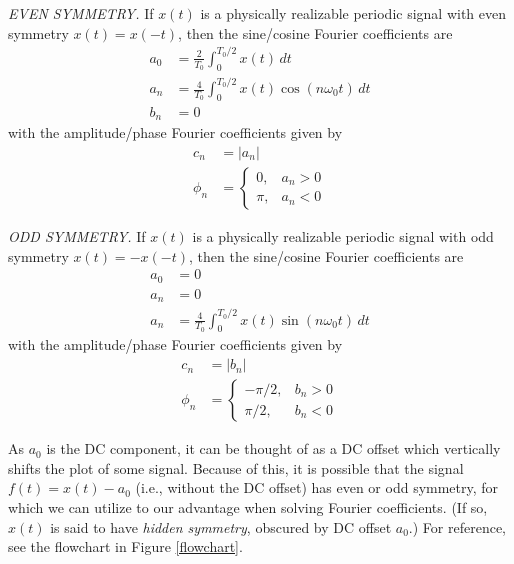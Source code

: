 \documentclass{report}
\begin{document}
\begin{tcolorbox}[width=\textwidth,colback={white}, sharp corners]
    \emph{EVEN SYMMETRY.}
    If $x(t)$ is a physically realizable periodic signal with even symmetry $x(t) = x(-t)$, then the sine/cosine Fourier coefficients are 
    \begin{align}
        a_0 &= \frac{2}{T_0}\int_{0}^{T_0/2} x(t) \,dt \\
        a_n &= \frac{4}{T_0}\int_{0}^{T_0/2} x(t)\cos(n\omega_0 t) \,dt \\
        b_n &= 0
    \end{align}
    with the amplitude/phase Fourier coefficients given by    
    \begin{align}
        c_n &= |a_n| \\
        \phi_n &= 
        \begin{cases}
            0, & a_n > 0 \\
            \pi, & a_n < 0
        \end{cases}
    \end{align}
\end{tcolorbox}
\begin{tcolorbox}[width=\textwidth,colback={white}, sharp corners]
    \emph{ODD SYMMETRY.}
    If $x(t)$ is a physically realizable periodic signal with odd symmetry $x(t) = -x(-t)$, then the sine/cosine Fourier coefficients are 
    \begin{align}
        a_0 &= 0 \\
        a_n &= 0 \\
        a_n &= \frac{4}{T_0}\int_{0}^{T_0/2} x(t)\sin(n\omega_0 t) \,dt 
    \end{align}
    with the amplitude/phase Fourier coefficients given by    
    \begin{align}
        c_n &= |b_n| \\
        \phi_n &= 
        \begin{cases}
            -\pi/2, & b_n > 0 \\
            \pi/2, & b_n < 0
        \end{cases}
    \end{align}
\end{tcolorbox}
As $a_0$ is the DC component, it can be thought of as a DC offset which vertically shifts the plot of some signal. Because of this, it is possible that 
the signal $f(t) = x(t) - a_0$ (i.e., without the DC offset) has even or odd symmetry, for which we can utilize to our advantage when solving Fourier coefficients. 
(If so, $x(t)$ is said to have \emph{hidden symmetry}, obscured by DC offset $a_0$.) For reference, see the flowchart in Figure \ref{flowchart}.
\end{document}
